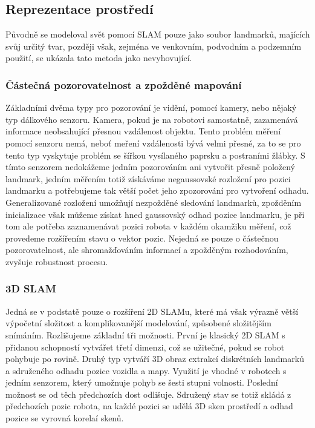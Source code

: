 \documentclass[11pt]{article}
\begin{document}
\subsection{Reprezentace prostředí}
Původně se modeloval svět pomocí SLAM pouze jako soubor landmarků, majících svůj určitý tvar, později však, zejména ve venkovním, podvodním a podzemním použití, se ukázala tato metoda jako nevyhovující.

\subsubsection{Částečná pozorovatelnost a zpožděné mapování}
Základními dvěma typy pro pozorování je vidění, pomocí kamery, nebo nějaký typ dálkového senzoru. Kamera, pokud je na robotovi samostatně, zazamenává informace neobsahující přesnou vzdálenost objektu. Tento problém měření pomocí senzoru nemá, neboť meření vzdálenosti bývá velmi přesné, za to se pro tento typ vyskytuje problém se šířkou vysílaného paprsku a postraními žlábky. S tímto senzorem nedokážeme jedním pozorováním ani vytvořit přesně položený landmark, jedním měřením totiž získáváme negaussovské rozložení pro pozici landmarku a potřebujeme tak větší počet jeho zpozorování pro vytvoření odhadu.\\
\indent Generalizované rozložení umožňují nezpožděné sledování landmarků, zpožděním inicializace však můžeme získat hned gaussovský odhad pozice landmarku, je při tom ale potřeba zaznamenávat pozici robota v každém okamžiku měření, což provedeme rozšířením stavu o vektor pozic. Nejedná se pouze o částečnou pozorovatelnost, ale shromažďováním informací a zpožděným rozhodováním, zvyšuje robustnost procesu. 

\subsubsection{3D SLAM}
Jedná se v podstatě pouze o rozšíření 2D SLAMu, které má však výrazně větší výpočetní složitost a komplikovanější modelování, způsobené složitějším snímáním. Rozlišujeme základní tři možnosti. První je klasický 2D SLAM s přidanou schopností vytvářet třetí dimenzi, což se užitečné, pokud se robot pohybuje po rovině. Druhý typ vytváří 3D obraz extrakcí diskrétních landmarků a sdruženého odhadu pozice vozidla a mapy. Využití je vhodné v robotech s jedním senzorem, který umožnuje pohyb se šesti stupni volnosti. Poslední možnost se od těch předchozích dost odlišuje. Sdružený stav se totiž skládá z předchozích pozic robota, na každé pozici se udělá 3D sken prostředí a odhad pozice se vyrovná korelaí skenů.
 
\end{document}
